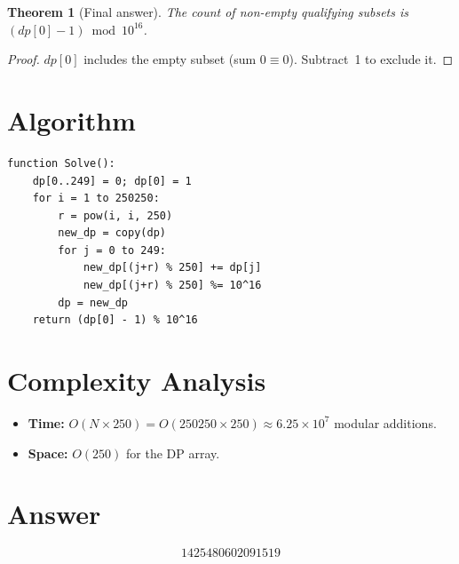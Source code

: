 \documentclass[12pt]{article}
\newtheorem{theorem}{Theorem}
\begin{document}
\begin{theorem}[Final answer]\label{thm:final}
The count of non-empty qualifying subsets is $(dp[0]-1)\bmod 10^{16}$.
\end{theorem}

\begin{proof}
$dp[0]$ includes the empty subset (sum $0\equiv 0$). Subtract~1 to exclude it.
\end{proof}

\section{Algorithm}

\begin{verbatim}
function Solve():
    dp[0..249] = 0; dp[0] = 1
    for i = 1 to 250250:
        r = pow(i, i, 250)
        new_dp = copy(dp)
        for j = 0 to 249:
            new_dp[(j+r) % 250] += dp[j]
            new_dp[(j+r) % 250] %= 10^16
        dp = new_dp
    return (dp[0] - 1) % 10^16
\end{verbatim}

\section{Complexity Analysis}

\begin{itemize}
\item \textbf{Time:} $O(N\times 250)=O(250250\times 250)\approx 6.25\times 10^7$ modular additions.
\item \textbf{Space:} $O(250)$ for the DP array.
\end{itemize}

\section{Answer}

\[
\boxed{1425480602091519}
\]
\end{document}
